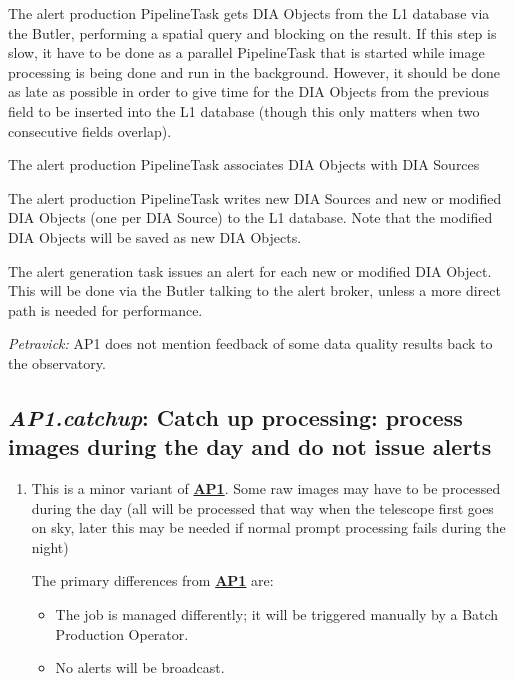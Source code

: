 \documentclass[DM,toc,lsstdraft]{lsstdoc}
\newcommand{\usecase}[3]{%
\subsection{\emph{#1}: #2}
\label{use:#1}
\begin{enumerate}[label=\alph*.]
#3
\end{enumerate}
}
\newcommand{\useref}[1]{\hyperref[use:#1]{\textcolor{lsstblue}{\textbf{#1}}}}
\begin{document}
{\item
The alert production PipelineTask gets DIA Objects from the L1 database via the Butler, performing a spatial query and blocking on the result.
If this step is slow, it have to be done as a parallel PipelineTask that is started while image processing is being done and run in the background.
However, it should be done as late as possible in order to give time for the DIA Objects from the previous field to be inserted into the L1 database (though this only matters when two consecutive fields overlap).

\item
The alert production PipelineTask associates DIA Objects with DIA Sources

\item
The alert production PipelineTask writes new DIA Sources and new or modified DIA Objects (one per DIA Source) to the L1 database.
Note that the modified DIA Objects will be saved as new DIA Objects.

\item
The alert generation task issues an alert for each new or modified DIA Object.
This will be done via the Butler talking to the alert broker, unless a more direct path is needed for performance.

}

\begin{draftnote}
\emph{Petravick:} AP1 does not mention feedback of some data quality results back to the observatory.
\end{draftnote}

\usecase{AP1.catchup}{Catch up processing: process images during the day and do not issue alerts}{%

\item
This is a minor variant of \useref{AP1}.
Some raw images may have to be processed during the day (all will be processed that way when the telescope first goes on sky, later this may be needed if normal prompt processing fails during the night)

The primary differences from \useref{AP1} are:
\begin{itemize}
\item The job is managed differently; it will be triggered manually by a Batch Production Operator.
\item No alerts will be broadcast.
\end{itemize}

}
\end{document}
